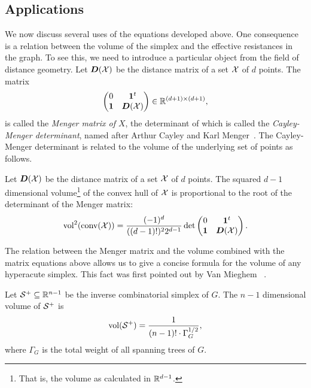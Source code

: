 \subsection{Applications}
We now discuss several  uses of the equations developed above. 
One consequence is a relation between the volume of the simplex and the effective resistances in the graph. To see this, we need to introduce a particular object from the field of distance geometry. Let $\vb*{D}(\mathcal{X})$ be the distance matrix of a set $\mathcal{X}$ of $d$ points. The matrix 
\begin{equation}
\label{eq:menger_matrix}
\begin{pmatrix}
0 & \vb{1}^t \\
\vb{1} & \vb*{D}(\mathcal{X})
\end{pmatrix}\in\mathbb{R}^{(d+1)\times (d+1)},
\end{equation}
is called the \emph{Menger matrix of $X$}, the determinant of which is called the \emph{Cayley-Menger determinant}, named after Arthur Cayley and Karl Menger~\cite{cayley1841theorem, Menger1928}. The Cayley-Menger determinant is related to the volume of the underlying set of points as follows. 


\begin{lemma}
	\label{lem:menger_volume}
	Let $\vb*{D}(\mathcal{X})$ be the distance matrix of a set $\mathcal{X}$ of $d$ points. The squared $d-1$ dimensional volume\footnote{That is, the volume as calculated in $\mathbb{R}^{d-1}$.} of the convex hull of $\mathcal{X}$ is proportional to the root of the determinant of the Menger matrix: 
	\begin{equation}
	\label{eq:vol(convX)}
	\textnormal{vol}^2(\textnormal{conv}(\mathcal{X})) = \frac{(-1)^d}{((d-1)!)^2 2^{d-1}} \det\begin{pmatrix}
	0 & \vb{1}^t \\
	\vb{1} & \vb*{D}(\mathcal{X})
	\end{pmatrix}.
	\end{equation} 
\end{lemma}

The relation between the Menger matrix and the volume combined with the matrix equations above allows us to give a concise formula for the volume of any hyperacute simplex. 
This fact  was first pointed out by Van Mieghem \etal~\cite{van2017pseudoinverse}. 

\begin{lemma}
	\label{lem:volume}
	Let $\mathcal{S}^+\subseteq\mathbb{R}^{n-1}$ be the inverse combinatorial simplex of $G$. The  $n-1$ dimensional volume of $\mathcal{S}^+$ is
	\begin{equation}
	\label{eq:vol(T)}
	\textnormal{vol}(\mathcal{S}^+) = \frac{1}{(n-1)!\cdot \Gamma_G^{1/2}},
	\end{equation}
	where $\Gamma_G$ is the total weight of all spanning  trees of $G$. 
\end{lemma}

